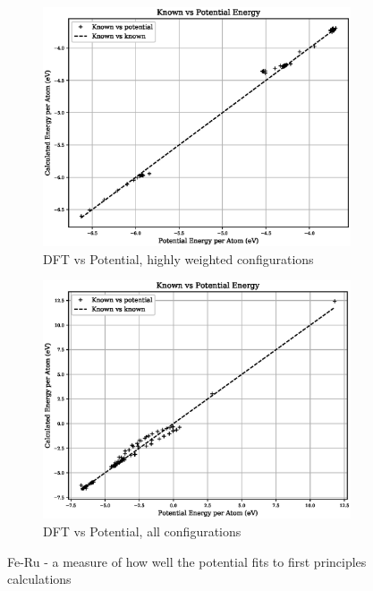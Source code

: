 \begin{figure}[htb]
\centering
\begin{subfigure}{.47\textwidth}
  \centering
  \includegraphics[width=.94\linewidth]{chapters/potentials_fe_pd_ru/feru_potential/potential_known_energy_fit_set.eps}  
  \caption{DFT vs Potential, highly weighted configurations}
  \label{fig:feru-energy-fit}
\end{subfigure}
\begin{subfigure}{.47\textwidth}
  \centering
  \includegraphics[width=.94\linewidth]{chapters/potentials_fe_pd_ru/feru_potential/potential_known_energy_full_set.eps}  
  \caption{DFT vs Potential, all configurations}
  \label{fig:feru-energy-full}
\end{subfigure}
\caption{Fe-Ru - a measure of how well the potential fits to first principles calculations}
\label{fig:feru-energy-fit}
\end{figure}

